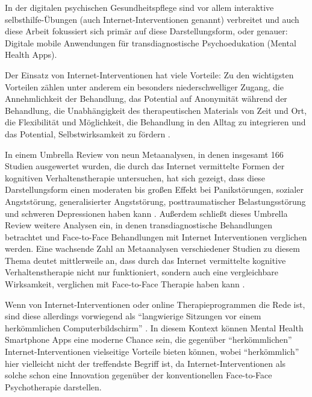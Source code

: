In der digitalen psychischen Gesundheitspflege sind vor allem interaktive selbsthilfe-Übungen 
(auch Internet-Interventionen genannt) verbreitet und auch diese Arbeit fokussiert sich 
primär auf diese Darstellungsform, oder genauer: 
Digitale mobile Anwendungen für transdiagnostische Psychoedukation (Mental Health Apps).

Der Einsatz von Internet-Interventionen hat viele Vorteile: Zu den wichtigsten Vorteilen 
zählen unter anderem ein besonders niederschwelliger Zugang, die Annehmlichkeit der Behandlung, 
das Potential auf Anonymität während der Behandlung, die Unabhängigkeit des therapeutischen Materials 
von Zeit und Ort, die Flexibilität und Möglichkeit, die Behandlung in den Alltag zu integrieren und das 
Potential, Selbstwirksamkeit zu fördern \cite[S.10]{weisel_innovations_2021}. %

In einem Umbrella Review von neun Metaanalysen, in denen insgesamt 166 Studien ausgewertet wurden, 
die durch das Internet vermittelte Formen der kognitiven Verhaltenstherapie untersuchen, hat sich gezeigt, 
dass diese Darstellungsform einen moderaten bis großen Effekt bei Panikstörungen, sozialer Angststörung, 
generalisierter Angststörung, posttraumatischer Belastungsstörung und schweren Depressionen haben kann 
\cite[]{andersson_internet_2019}. %
Außerdem schließt dieses Umbrella Review weitere Analysen ein, in denen transdiagnostische Behandlungen betrachtet 
und Face-to-Face Behandlungen mit Internet Interventionen verglichen werden. 
Eine wachsende Zahl an Metaanalysen verschiedener Studien zu diesem Thema deutet mittlerweile an, 
dass durch das Internet vermittelte kognitive Verhaltenstherapie nicht nur funktioniert, 
sondern auch eine vergleichbare Wirksamkeit, verglichen mit Face-to-Face Therapie haben kann 
\cite[]{andersson_internet_2019}. %

Wenn von Internet-Interventionen oder online Therapieprogrammen die Rede ist, 
sind diese allerdings vorwiegend als “langwierige Sitzungen vor einem herkömmlichen Computerbildschirm” 
\cite[]{anthes_e_mental_2016}. %
In diesem Kontext können Mental Health Smartphone Apps eine moderne Chance sein, die gegenüber “herkömmlichen” 
Internet-Interventionen vielseitige Vorteile bieten können, wobei “herkömmlich” hier vielleicht 
nicht der treffendste Begriff ist, da Internet-Interventionen als solche schon eine Innovation 
gegenüber der konventionellen Face-to-Face Psychotherapie darstellen. 



